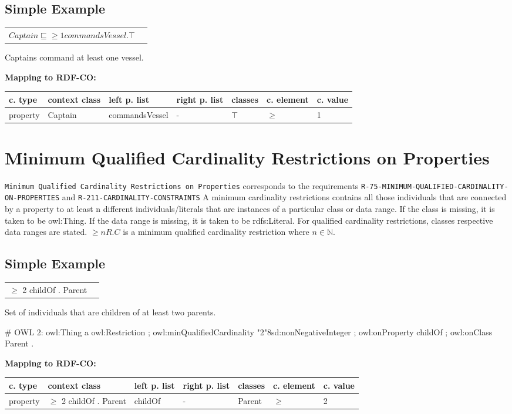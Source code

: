 \documentclass{llncs}
\newcommand{\ms}[1]{\texttt{#1}}
\newenvironment{gcotable}{
  \scriptsize
  \sffamily
  \vspace{0cm}
	\begin{center}
	\textbf{\vspace{0.4cm}Mapping to RDF-CO:} \\
  \begin{tabular}{l|l|l|l|l|l|l}
	\hline
  \textbf{c. type} & \textbf{context class} & \textbf{left p. list} & \textbf{right p. list} & \textbf{classes} & \textbf{c. element} & \textbf{c. value} \\
  \hline

}{
  \hline
  \end{tabular}
	\end{center}
}
\newenvironment{DL}{
  \vspace{0cm}
	\begin{center}
  \begin{tabular}{r l}

}{
  \end{tabular}
	\end{center}
}
\begin{document}
\subsection{Simple Example}

\begin{DL}
$Captain \sqsubseteq \geq1 commandsVessel.\top $
\end{DL}

Captains command at least one vessel.

\begin{gcotable}
property & Captain & commandsVessel & - & $\top$ & $\geq$ & 1 \\
\end{gcotable}

\section{Minimum Qualified Cardinality Restrictions on Properties}

\ms{Minimum Qualified Cardinality Restrictions on Properties} corresponds to the requirements
\ms{R-75-MINIMUM-QUALIFIED-CARDINALITY-ON-PROPERTIES} and \ms{R-211-CARDINALITY-CONSTRAINTS}
A minimum cardinality restrictions contains all those individuals that are connected by a property to at least n different individuals/literals 
that are instances of a particular class or data range. If the class is missing, it is taken to be owl:Thing. 
If the data range is missing, it is taken to be rdfs:Literal.
For qualified cardinality restrictions, classes respective data ranges are stated.
$\geq n R. C$ is a minimum qualified cardinality restriction where $n \in \mathbb{N}$.

\subsection{Simple Example}

\begin{DL}
$\geq$ 2 childOf . Parent
\end{DL}

Set of individuals that are children of at least two parents.

\begin{ex}
# OWL 2:
owl:Thing
    a owl:Restriction ;
    owl:minQualifiedCardinality "2"^^xsd:nonNegativeInteger ;
    owl:onProperty childOf ;
    owl:onClass Parent .
\end{ex}

\begin{gcotable}
property & $\geq$ 2 childOf . Parent & childOf & -  & Parent & $\geq$ & 2 \\
\end{gcotable}
\end{document}
